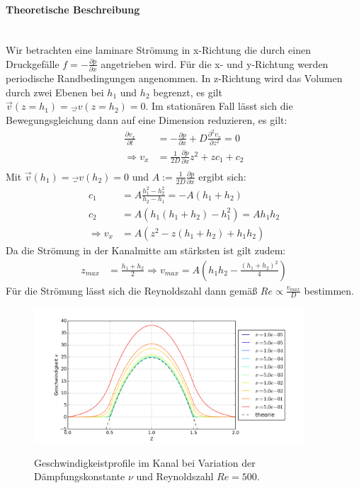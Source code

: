 \paragraph*{Theoretische Beschreibung}\mbox{}\\
Wir betrachten eine laminare Strömung in x-Richtung die durch einen Druckgefälle $f=-\frac{\partial p}{\partial x}$ angetrieben wird.
Für die x- und y-Richtung werden periodische Randbedingungen angenommen. In z-Richtung wird das Volumen durch zwei Ebenen bei $h_1$ und $h_2$ begrenzt,
es gilt $\vec{v}(z=h_1) = \vec_{v}(z=h_2) = 0$.
Im stationären Fall lässt sich  die Bewegungsgleichung dann  auf eine Dimension reduzieren, es gilt:
\begin{align}
\frac{\partial v_x}{\partial t} &= - \frac{\partial p}{\partial x} + D \frac{\partial^2 v_x}{\partial z^2} = 0 \\
\Rightarrow v_x &= \frac{1}{2D}\frac{\partial p}{\partial x}z^2 + zc_1 + c_2\\
\end{align}
Mit $\vec{v}(h_1) = \vec_{v}(h_2) = 0$ und $A:=\frac{1}{2D}\frac{\partial p}{\partial x}$ ergibt sich:
\begin{align}
c_1 &= A\frac{h_1^2 -h_2^2}{h_2 - h_1} = -A(h_1+h_2)\\
c_2 &= A(h_1(h_1 + h_2) - h_1^2) = Ah_1h_2\\
\Rightarrow v_x &= A(z^2 - z(h_1 + h_2) + h_1h_2)
\end{align}
Da die Strömung in der Kanalmitte am stärksten ist gilt zudem:
\begin{align}
z_{max} &= \frac{h_1+h_2}{2}\Rightarrow v_{max} = A\left(h_1h_2 - \frac{(h_1 + h_2)^2}{4}\right)
\end{align}
Für die Strömung lässt sich die Reynoldszahl dann gemäß $Re \propto \frac{v_{max}}{D}$  bestimmen.
\begin{figure}[!hbtp]
  \centering
  \includegraphics[width=0.9\textwidth]{gfx/immersed_boundary_methods/vp_flow.png}\label{fig:vp_flow}
  \caption{Geschwindigkeistprofile im Kanal bei Variation der Dämpfungskonstante $\nu$ und Reynoldszahl $Re=500$.}
\end{figure}


